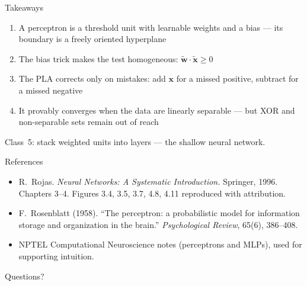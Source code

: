 \documentclass[aspectratio=169, 11pt]{beamer}
\begin{document}
\begin{frame}{Takeaways}
  \begin{enumerate}\setlength{\itemsep}{2pt}
    \item A \alert{perceptron} is a threshold unit with
          \alert{learnable weights} and a \alert{bias} ---
          its boundary is a freely oriented hyperplane
    \item The bias trick makes the test homogeneous:
          $\tilde{\mathbf{w}}\!\cdot\!\tilde{\mathbf{x}}\ge 0$
    \item The \alert{PLA} corrects only on mistakes:
          add $\mathbf{x}$ for a missed positive, subtract
          for a missed negative
    \item It \alert{provably converges} when the data are
          linearly separable --- but XOR and non-separable
          sets remain out of reach
  \end{enumerate}
  \vspace{0.3em}
  \begin{redhighlight}
    Class~5: stack weighted units into layers --- the shallow
    neural network.
  \end{redhighlight}
\end{frame}

\begin{frame}{References}
  \footnotesize
  \begin{itemize}
    \item R.~Rojas. \textit{Neural Networks: A Systematic
          Introduction.} Springer, 1996. Chapters 3--4.
          Figures 3.4, 3.5, 3.7, 4.8, 4.11 reproduced with
          attribution.
    \item F.~Rosenblatt (1958). ``The perceptron: a
          probabilistic model for information storage and
          organization in the brain.'' \textit{Psychological
          Review}, 65(6), 386--408.
    \item NPTEL Computational Neuroscience notes
          (perceptrons and MLPs), used for supporting
          intuition.
  \end{itemize}
\end{frame}

\begin{frame}[standout]
  Questions?
\end{frame}
\end{document}
